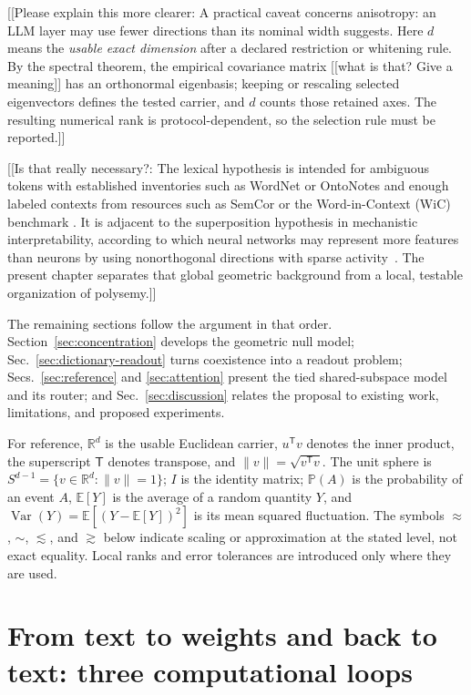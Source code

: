 \documentclass[
  aps,
  reprint,
  superscriptaddress,
  floatfix,
  nofootinbib,
  longbibliography
]{revtex4-2}
\newcommand{\R}{\mathbb{R}}
\newcommand{\E}{\mathbb{E}}
\newcommand{\Prob}{\mathbb{P}}
\newcommand{\Sph}[1]{S^{#1}}
\newcommand{\T}{^{\mathsf{T}}}
\newcommand{\norm}[1]{\lVert #1 \rVert}
\DeclareMathOperator{\Var}{Var}
\begin{document}
[[Please explain this more clearer: A practical caveat concerns anisotropy: an LLM layer may use fewer directions
than its nominal width suggests.  Here $d$ means the \emph{usable exact
dimension} after a declared restriction or whitening rule.  By the spectral
theorem, the empirical covariance matrix [[what is that? Give a meaning]] has an orthonormal eigenbasis; keeping
or rescaling selected eigenvectors defines the tested carrier, and $d$ counts
those retained axes.  The resulting numerical rank is protocol-dependent, so
the selection rule must be reported.]]

[[Is that really necessary?: The lexical hypothesis is intended for ambiguous tokens with established
inventories such as WordNet or OntoNotes and enough labeled contexts from
resources such as SemCor or the Word-in-Context (WiC) benchmark
\cite{pilehvar2019wic}.  It is adjacent to the superposition hypothesis in
mechanistic interpretability, according to which neural networks may represent
more features than neurons by using nonorthogonal directions with sparse
activity~\cite{elhage2022superposition}.  The present chapter separates that
global geometric background from a local, testable organization of polysemy.]]

The remaining sections follow the argument in that order.
Section~\ref{sec:concentration} develops the geometric null model;
Sec.~\ref{sec:dictionary-readout} turns coexistence into a readout problem;
Secs.~\ref{sec:reference} and \ref{sec:attention} present the tied
shared-subspace model and its router; and Sec.~\ref{sec:discussion} relates the
proposal to existing work, limitations, and proposed experiments.

For reference, $\R^d$ is the usable Euclidean carrier, $u\T v$ denotes the
inner product, the superscript $\mathsf T$ denotes transpose, and
$\norm{v}=\sqrt{v\T v}$.  The unit sphere is
$\Sph{d-1}=\{v\in\R^d:\norm v=1\}$; $I$ is the identity matrix;
$\Prob(A)$ is the probability of an event $A$, $\E[Y]$ is the average of a
random quantity $Y$, and
$\Var(Y)=\E[(Y-\E[Y])^2]$ is its mean squared fluctuation.  The
symbols $\approx$, $\sim$, $\lesssim$, and $\gtrsim$ below indicate scaling or
approximation at the stated level, not exact equality.  Local ranks and error
tolerances are introduced only where they are used.

\section{From text to weights and back to text: three computational loops}
\label{sec:llm-loops}
\end{document}

